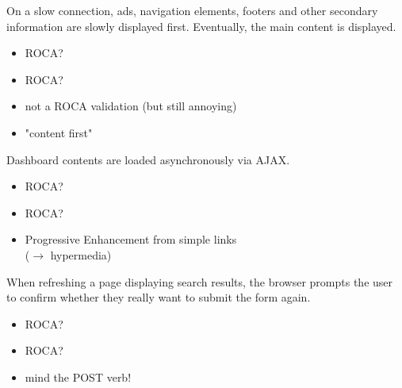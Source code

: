 \documentclass{beamer}
\newcommand{\rocaok}{\ding{51}}
\newcommand{\rocafail}{\ding{55}}
\begin{document}
\begin{frame}
  On a slow connection, ads, navigation elements, footers and other secondary
  information are slowly displayed first. Eventually, the main content is displayed.

  \vspace{0.3cm}
  \begin{itemize}
    \item<1|only@1>[\Large $\square$] \Large ROCA?
    \item<2|only@2>[\Large ?] \Large ROCA?
    \item<2> not a ROCA validation (but still annoying)
    \item<2> "content first"
  \end{itemize}

\end{frame}

\begin{frame}
  Dashboard contents are loaded asynchronously via AJAX.

  \vspace{0.3cm}
  \begin{itemize}
    \item<1|only@1>[\Large $\square$] \Large ROCA?
    \item<2|only@2>[\Large \rocaok] \Large ROCA?
    \item<2> Progressive Enhancement from simple links \\ (\ensuremath{\rightarrow} hypermedia)
  \end{itemize}

\end{frame}

\begin{frame}
  When refreshing a page displaying search results, the browser prompts the
  user to confirm whether they really want to submit the form again.

  \vspace{0.3cm}
  \begin{itemize}
    \item<1|only@1>[\Large $\square$] \Large ROCA?
    \item<2|only@2>[\Large \rocafail] \Large ROCA?
    \item<2> mind the POST verb!
  \end{itemize}

\end{frame}
\end{document}
